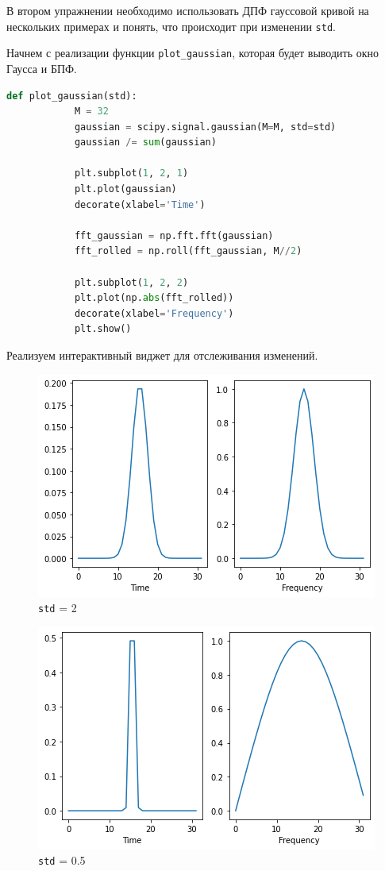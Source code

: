 \documentclass[a4paper, 14pt]{extarticle}
\begin{document}
    В втором упражнении необходимо использовать ДПФ гауссовой кривой на нескольких примерах и понять, что происходит при изменении \texttt{std}.

    Начнем с реализации функции \texttt{plot\_gaussian}, которая будет выводить окно Гаусса и БПФ.

    \begin{lstlisting}[language=Python, caption= Функция plot\_gaussian, label={lst:plot_gaussian}]
        def plot_gaussian(std):
            M = 32
            gaussian = scipy.signal.gaussian(M=M, std=std)
            gaussian /= sum(gaussian)

            plt.subplot(1, 2, 1)
            plt.plot(gaussian)
            decorate(xlabel='Time')

            fft_gaussian = np.fft.fft(gaussian)
            fft_rolled = np.roll(fft_gaussian, M//2)

            plt.subplot(1, 2, 2)
            plt.plot(np.abs(fft_rolled))
            decorate(xlabel='Frequency')
            plt.show()
    \end{lstlisting}

    Реализуем интерактивный виджет для отслеживания изменений.

    \begin{figure}[H]
        \centering
        \includegraphics[width=0.8\linewidth]{DTF_2}
        \caption{\texttt{std} = 2}
        \label{fig:DTF_2}
    \end{figure}

    \begin{figure}[H]
        \centering
        \includegraphics[width=0.8\linewidth]{DTF_0.5}
        \caption{\texttt{std} = 0.5}
        \label{fig:DTF_0.5}
    \end{figure}
\end{document}
